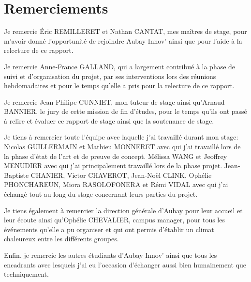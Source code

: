 \documentclass[11pt]{article}
\begin{document}
  \section{Remerciements}    
    Je remercie Éric REMILLERET et Nathan CANTAT, mes maîtres de stage, 
    pour m'avoir donné l'opportunité de rejoindre 
    Aubay Innov' ainsi que pour l'aide à la relecture de ce rapport.    
    
    Je remercie Anne-France GALLAND, qui a largement contribué à la phase de suivi et d'organisation du projet, par ses interventions 
    lors des réunions hebdomadaires et pour le temps qu'elle a pris pour la relecture de ce rapport.    
    
    Je remercie Jean-Philipe CUNNIET, mon tuteur de stage ainsi qu'Arnaud BANNIER, le jury de cette mission de fin d'études, 
    pour le temps qu'ils ont passé à relire et évaluer ce rapport de stage ainsi que la soutenance de stage.    

    Je tiens à remercier toute l'équipe avec laquelle j'ai 
    travaillé durant mon stage:    
    Nicolas GUILLERMAIN et Mathieu MONNERET avec qui j'ai travaillé lors 
    de la phase d'état de l'art et de preuve de concept.
    Mélissa WANG et Jeoffrey MENUDIER avec qui j'ai principalement 
    travaillé lors de la phase projet. 
    Jean-Baptiste CHANIER, Victor CHAVEROT, Jean-Noël CLINK,
    Ophélie PHONCHAREUN, Miora RASOLOFONERA et Rémi VIDAL avec qui j'ai échangé tout au 
    long du stage concernant leurs parties du projet.       
    
    Je tiens également à remercier la direction générale d'Aubay pour leur accueil et leur écoute ainsi qu'Ophélie CHEVALIER, campus manager, 
    pour tous les événements qu'elle a pu organiser et qui ont permis d'établir un climat chaleureux entre les différents groupes.
        
    Enfin, je remercie les autres étudiants d’Aubay Innov' ainsi que tous les encadrants avec lesquels j'ai eu l'occasion d'échanger 
    aussi bien humainement que techniquement.

  \pagebreak
\end{document}
